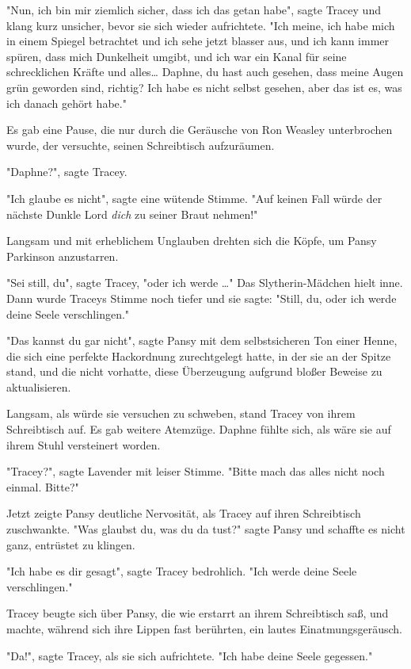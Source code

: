 {"Nun, ich bin mir ziemlich sicher, dass ich das getan habe", sagte Tracey und klang kurz unsicher, bevor sie sich wieder aufrichtete. "Ich meine, ich habe mich in einem Spiegel betrachtet und ich sehe jetzt blasser aus, und ich kann immer spüren, dass mich Dunkelheit umgibt, und ich war ein Kanal für seine schrecklichen Kräfte und alles… Daphne, du hast auch gesehen, dass meine Augen grün geworden sind, richtig? Ich habe es nicht selbst gesehen, aber das ist es, was ich danach gehört habe."

Es gab eine Pause, die nur durch die Geräusche von Ron Weasley unterbrochen wurde, der versuchte, seinen Schreibtisch aufzuräumen.

"Daphne?", sagte Tracey.

"Ich glaube es nicht", sagte eine wütende Stimme. "Auf keinen Fall würde der nächste Dunkle Lord \emph{dich} zu seiner Braut nehmen!"

Langsam und mit erheblichem Unglauben drehten sich die Köpfe, um Pansy Parkinson anzustarren.

"Sei still, du", sagte Tracey, "oder ich werde …" Das Slytherin-Mädchen hielt inne. Dann wurde Traceys Stimme noch tiefer und sie sagte: "Still, du, oder ich werde deine Seele verschlingen."

"Das kannst du gar nicht", sagte Pansy mit dem selbstsicheren Ton einer Henne, die sich eine perfekte Hackordnung zurechtgelegt hatte, in der sie an der Spitze stand, und die nicht vorhatte, diese Überzeugung aufgrund bloßer Beweise zu aktualisieren.

Langsam, als würde sie versuchen zu schweben, stand Tracey von ihrem Schreibtisch auf. Es gab weitere Atemzüge. Daphne fühlte sich, als wäre sie auf ihrem Stuhl versteinert worden.

"Tracey?", sagte Lavender mit leiser Stimme. "Bitte mach das alles nicht noch einmal. Bitte?"

Jetzt zeigte Pansy deutliche Nervosität, als Tracey auf ihren Schreibtisch zuschwankte. "Was glaubst du, was du da tust?" sagte Pansy und schaffte es nicht ganz, entrüstet zu klingen.

"Ich habe es dir gesagt", sagte Tracey bedrohlich. "Ich werde deine Seele verschlingen."

Tracey beugte sich über Pansy, die wie erstarrt an ihrem Schreibtisch saß, und machte, während sich ihre Lippen fast berührten, ein lautes Einatmungsgeräusch.

"Da!", sagte Tracey, als sie sich aufrichtete. "Ich habe deine Seele gegessen."

}
